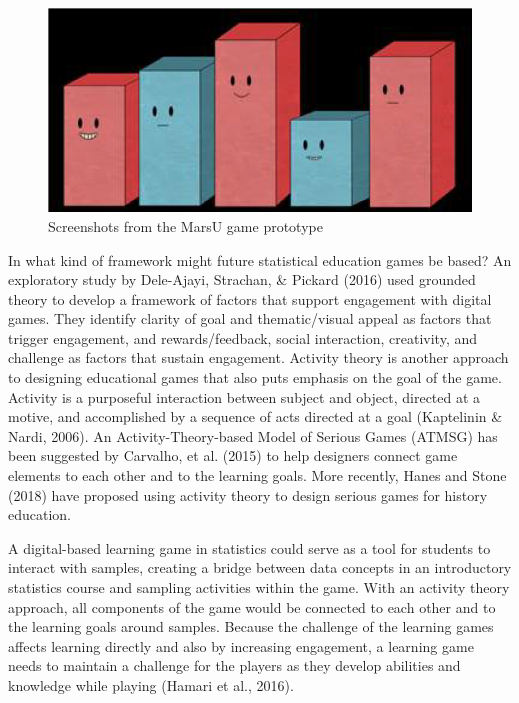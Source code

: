 \documentclass[11.5pt]{sig-alternate} %
\begin{document}
\begin{large}
\begin{figure}[h]
    \centering
    \includegraphics[width=1\linewidth]{Fig_6b.png}
    \caption{Screenshots from the MarsU game prototype}
\end{figure}

In what kind of framework might future statistical education games be based? An exploratory study by Dele-Ajayi, Strachan, \& Pickard (2016) used grounded theory to develop a framework of factors that support engagement with digital games. They identify clarity of goal and thematic/visual appeal as factors that trigger engagement, and rewards/feedback, social interaction, creativity, and challenge as factors that sustain engagement. Activity theory is another approach to designing educational games that also puts emphasis on the goal of the game. Activity is a purposeful interaction between subject and object, directed at a motive, and accomplished by a sequence of acts directed at a goal (Kaptelinin \& Nardi, 2006). An Activity-Theory-based Model of Serious Games (ATMSG) has been suggested by Carvalho, et al. (2015) to help designers connect game elements to each other and to the learning goals. More recently, Hanes and Stone (2018) have proposed using activity theory to design serious games for history education. 

A digital-based learning game in statistics could serve as a tool for students to interact with samples, creating a bridge between data concepts in an introductory statistics course and sampling activities within the game. With an activity theory approach, all components of the game would be connected to each other and to the learning goals around samples. Because the challenge of the learning games affects learning directly and also by increasing engagement, a learning game needs to maintain a challenge for the players as they develop abilities and knowledge while playing (Hamari et al., 2016).


\end{large}
\end{document}
